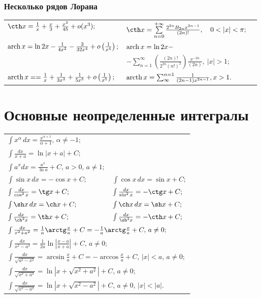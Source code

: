 \subsubsection{Несколько рядов Лорана}
\begin{longtable}[l]{ l l l }
$\cth x = \frac{1}{x} + \frac{x}{3}+\frac{x^3}{45}+o(x^3);$
&
$\cth x  = \sum\limits_{n=0}^{+\infty} \frac{2^{2n}B_{2n}x^{2n-1}}{(2n)!},\quad0<|x|<\pi;$
\\
$\operatorname{arch} x = \ln 2x - \frac{1}{4x^2}-\frac{3}{32x^4}+o\left(\frac{1}{x^{4}}\right);$ 
&
$\operatorname{arch} x = \ln 2x - $
\\
& $-\sum_{n=1}^\infty \left( \frac {(2n)!} {2^{2n}(n!)^2} \right) \frac {x^{-2n}} {(2n)} , \ |x| > 1; $
\\
$\operatorname{arcth} x = =\frac{1}{x}+\frac{1}{3x^3}+\frac{1}{5x^5}+o\left(\frac{1}{x^5}\right); $
&
$\operatorname{arcth} x = \sum_{\infty}^{n=1}\frac{1}{(2n-1)x^{2n-1}}, x > 1.$
\end{longtable}

\section{Основные неопределенные интегралы}
\begin{longtable}[l]{l l}
$\int x^\alpha \,dx = \frac{x^{\alpha+1}}{\alpha+1},\, \alpha\neq -1;$ & $ $ 
\\ $\int\frac{dx}{x+a} = \ln|x+a|+C;$ & $ $ 
\\ $\int a^x dx = \frac{a^x}{\ln a} + C, \, a>0,\, a\neq 1;$ & $ $ 
\\ $\int \sin x\,dx =-\cos x + C; $ 
& $\int \cos x \,dx = \sin x + C;$ 
\\ $\int \frac{dx}{\cos^2 x} = \tg x + C;$ 
& $\int \frac{dx}{\sin^2 x} = -\ctg x + C;$ 
\\ $\int \sh x \,dx = \ch x + C; $ 
& $\int \ch x \,dx = \sh x + C;$ 
\\ $\int \frac{dx}{\ch^2 x} = \th x + C; $ 
& $\int \frac{dx}{\sh^2 x} = -\cth x + C; $ 
\\ \multicolumn{2}{l}{$\int\frac{dx}{x^2+a^2} = \frac{1}{a}\arctg\frac{x}{a} + C = -\frac{1}{a}\arctg\frac{x}{a} + C,\, a\neq 0; $}
\\ \multicolumn{2}{l}{$\int\frac{dx}{x^2-a^2} = \frac{1}{2a}\ln\left|\frac{x-a}{x+a}\right| + C, \, a\neq 0 ;$ }
\\ \multicolumn{2}{l}{$\int\frac{dx}{\sqrt{a^2-x^2}} = \arcsin\frac{x}{a} + C=-\arccos\frac{x}{a} + C$, $|x|<a$, $a\neq 0$;}
\\ \multicolumn{2}{l}{$\int\frac{dx}{\sqrt{x^2+a^2}} = \ln|x+\sqrt{x^2+a^2}|+C$, $a\neq 0$;}
\\\multicolumn{2}{l}{$\int\frac{dx}{\sqrt{x^2-a^2}}= \ln|x+\sqrt{x^2-a^2}|+C$, $a\neq 0$, $|x|<|a|$.}
\end{longtable}


